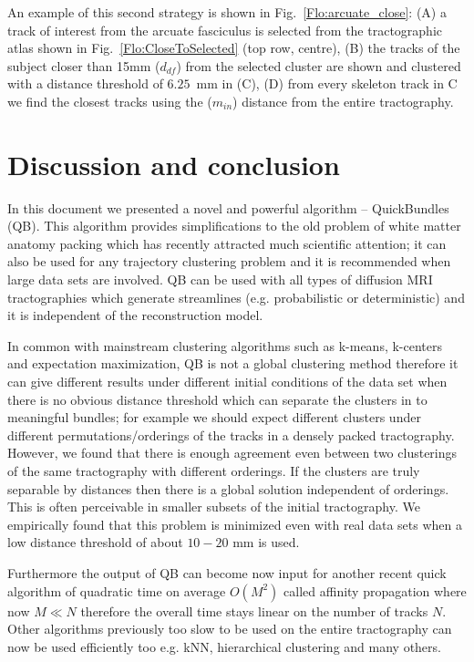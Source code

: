 \documentclass[preprint,authoryear,a4paper,10pt,onecolumn]{elsarticle}
\begin{document}
An example of this second strategy is shown in
Fig.~\ref{Flo:arcuate_close}: (A) a track of interest from the arcuate
fasciculus is selected from the tractographic atlas shown in
Fig.~\ref{Flo:CloseToSelected} (top row, centre), (B) the tracks of the
subject closer than 15mm ($d_{df}$) from the selected cluster are shown
and clustered with a distance threshold of $6.25$~mm in (C), (D) from
every skeleton track in C we find the closest tracks using the
($m_{in}$) distance from the entire tractography.


\section{Discussion and conclusion}

In this document we presented a novel and powerful algorithm --
QuickBundles (QB). This algorithm provides simplifications to the old
problem of white matter anatomy packing which has recently attracted
much scientific attention; it can also be used for any trajectory
clustering problem and it is recommended when large data sets are
involved. QB can be used with all types of diffusion MRI tractographies
which generate streamlines (e.g. probabilistic or deterministic) and it
is independent of the reconstruction model.

In common with mainstream clustering algorithms such as k-means,
k-centers and expectation maximization, QB is not a global clustering
method therefore it can give different results under different initial
conditions of the data set when there is no obvious distance threshold
which can separate the clusters in to meaningful bundles; for example we
should expect different clusters under different permutations/orderings
of the tracks in a densely packed tractography. However, we found that
there is enough agreement even between two clusterings of the same
tractography with different orderings. If the clusters are truly
separable by distances then there is a global solution independent of
orderings. This is often perceivable in smaller subsets of the initial
tractography. We empirically found that this problem is minimized even
with real data sets when a low distance threshold of about $10-20$ mm is
used.

Furthermore the output of QB can become now input for another recent
quick algorithm of quadratic time on average $O(M^{2})$ called affinity
propagation where now $M\ll N$ therefore the overall time stays linear
on the number of tracks $N$. Other algorithms previously too slow to be
used on the entire tractography can now be used efficiently too
e.g. kNN, hierarchical clustering and many others.
\end{document}
